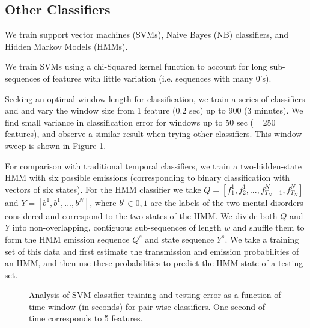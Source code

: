 \documentclass[10pt,twocolumn,letterpaper]{article}
\begin{document}
\subsection {Other Classifiers}
We train support vector machines (SVMs), Naive Bayes (NB) classifiers, and Hidden Markov Models (HMMs). 

We train SVMs using a chi-Squared kernel function to account for long sub-sequences of features with little variation (i.e. sequences with many 0's). 

Seeking an optimal window length for classification, we train a series of classifiers and and vary the window size from 1 feature (0.2 sec) up to 900 (3 minutes). We find small variance in classification error for windows up to 50 sec (= 250 features), and observe a similar result when trying other classifiers. This window sweep is shown in Figure \ref{fig:window_lengths}.

For comparison with traditional temporal classifiers, we train a two-hidden-state HMM with six possible emissions (corresponding to binary classification with vectors of six states). For the HMM classifier we take $Q=[f_1^1, f_2^1,...,f_{T_N-1}^N,f_{T_N}^N]$ and $Y=[b^1, b^1, ...,b^N]$, where $b^i \in {0,1}$ are the labels of the two mental disorders considered and correspond to the two states of the HMM. We divide both $Q$ and $Y$ into non-overlapping, contiguous sub-sequences of length $w$ and shuffle them to form the HMM emission sequence $Q^{s}$ and state sequence $Y^s$. We take a training set of this data and first estimate the transmission and emission probabilities of an HMM, and then use these probabilities to predict the HMM state of a testing set. 

\begin{figure}[h]
        \centering
  
            \hfill
               \caption{Analysis of SVM classifier training and testing error as a function of time window  (in seconds) for pair-wise classifiers. One second of time corresponds to 5 features.}
        \label{fig:window_lengths}
\end{figure}
\end{document}
